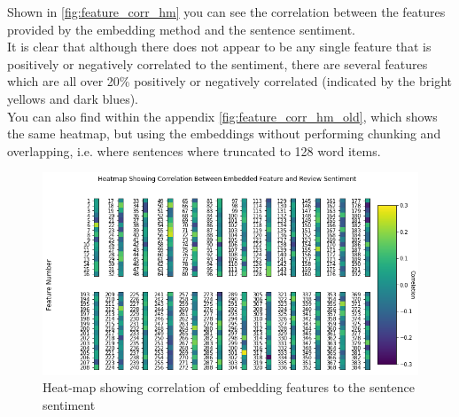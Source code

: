 Shown in \autoref{fig:feature_corr_hm} you can see the correlation between the features provided  by the embedding method and the sentence sentiment.\\
It is clear that although there does not appear to be any single feature that is positively or negatively correlated to the sentiment, there are several features which are all over 20\% positively or negatively correlated (indicated by the bright yellows and dark blues).\\
You can also find within the appendix \autoref{fig:feature_corr_hm_old}, which shows the same heatmap, but using the embeddings without performing chunking and overlapping, i.e. where sentences where truncated to 128 word items.
\begin{figure}[h]
    \includegraphics[width=\textwidth]{figures/Feature_Correlation_Heatmap_Non_Trunkated_Embedding.png}
    \caption{\label{fig:feature_corr_hm} Heat-map showing correlation of embedding features to the sentence sentiment}
\end{figure}